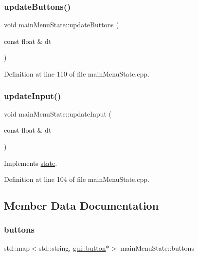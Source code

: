 \subsubsection{\texorpdfstring{update\+Buttons()}{updateButtons()}}
{\footnotesize\ttfamily void main\+Menu\+State\+::update\+Buttons (\begin{DoxyParamCaption}\item[{const float \&}]{dt }\end{DoxyParamCaption})}



Definition at line 110 of file main\+Menu\+State.\+cpp.

\mbox{\label{classmain_menu_state_ab21e2978f82bf421c637cc74730aeca6}} 
\subsubsection{\texorpdfstring{update\+Input()}{updateInput()}}
{\footnotesize\ttfamily void main\+Menu\+State\+::update\+Input (\begin{DoxyParamCaption}\item[{const float \&}]{dt }\end{DoxyParamCaption})\hspace{0.3cm}{\ttfamily [virtual]}}



Implements \mbox{\hyperlink{classstate_a1f124791a5e818794ba0eb1ac25bff99}{state}}.



Definition at line 104 of file main\+Menu\+State.\+cpp.



\subsection{Member Data Documentation}
\mbox{\label{classmain_menu_state_af1b67560d8a49f19c111a31a9d91dd41}} 
\subsubsection{\texorpdfstring{buttons}{buttons}}
{\footnotesize\ttfamily std\+::map$<$std\+::string, \mbox{\hyperlink{classgui_1_1button}{gui\+::button}}$\ast$$>$ main\+Menu\+State\+::buttons\hspace{0.3cm}{\ttfamily [protected]}}



